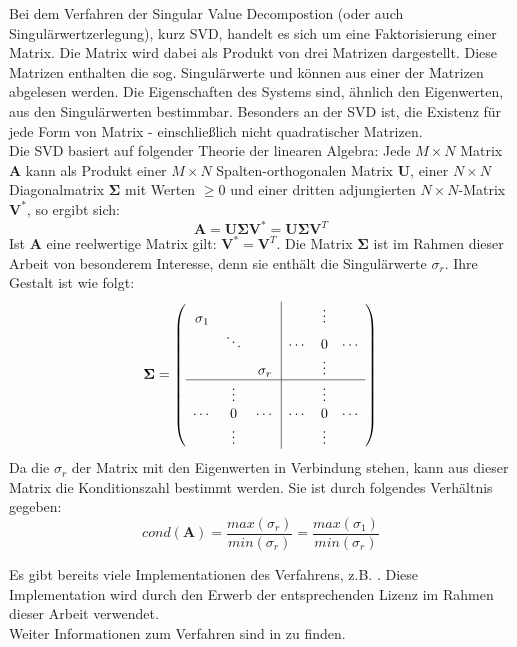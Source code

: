 Bei dem Verfahren der Singular Value Decompostion (oder auch Singulärwertzerlegung), kurz SVD, handelt es sich um eine Faktorisierung einer Matrix. Die Matrix wird dabei als Produkt von drei Matrizen dargestellt. Diese Matrizen enthalten die sog. Singulärwerte und können aus einer der Matrizen abgelesen werden. Die Eigenschaften des Systems sind, ähnlich den Eigenwerten, aus den Singulärwerten bestimmbar. Besonders an der SVD ist, die Existenz für jede Form von Matrix - einschließlich nicht quadratischer Matrizen.\\
Die SVD basiert auf folgender Theorie der linearen Algebra: Jede $M \times N$ Matrix $\mathbf{A}$ kann als Produkt einer $M \times N$ Spalten-orthogonalen Matrix $\mathbf{U}$, einer $N \times N$ Diagonalmatrix $\mathbf{\Sigma}$ mit Werten $\geq 0$ und einer dritten adjungierten $N \times N$-Matrix $\mathbf{V^*}$, so ergibt sich:
%
\begin{equation}
\mathbf{A}= \mathbf{U \Sigma V^*} = \mathbf{U \Sigma V}^T
\end{equation}
Ist $\mathbf{A}$ eine reelwertige Matrix gilt: $ \mathbf{V^*} = \mathbf{V}^T $. Die Matrix $\mathbf{ \Sigma }$ ist im Rahmen dieser Arbeit von besonderem Interesse, denn sie enthält die Singulärwerte $\sigma_r$. Ihre Gestalt ist wie folgt:
%
\begin{equation}
	\mathbf{\Sigma} = \left(\begin{array}{ccc|ccc}
	\sigma_1 &          &          &        & \vdots &        \\
	         & \ddots   &          & \cdots & 0      & \cdots \\
	         &          & \sigma_r &        & \vdots &        \\
	\hline
	         &  \vdots  &          &        & \vdots &        \\
	\cdots   &  0       & \cdots   & \cdots & 0      & \cdots \\
	         &  \vdots  &          &        & \vdots &        \\
	
	\end{array}\right)\nonumber
\end{equation}
%
%
Da die $\sigma_r$ der Matrix mit den Eigenwerten in Verbindung stehen, kann aus dieser Matrix die Konditionszahl bestimmt werden. Sie ist durch folgendes Verhältnis gegeben: 
\begin{equation}
	\label{eq:cond_from_svd}
	cond(\mathbf{A})=\frac{max(\sigma_r)}{min(\sigma_r)}=\frac{max(\sigma_1)}{min(\sigma_r)}
\end{equation} 

Es gibt bereits viele Implementationen des Verfahrens, z.B. \cite{press2007numerical}. Diese Implementation wird durch den Erwerb der entsprechenden Lizenz im Rahmen dieser Arbeit verwendet.\\

Weiter Informationen zum Verfahren sind in \cite[Kaptiel 4.6.3]{bronstejn2012taschenbuch} zu finden.